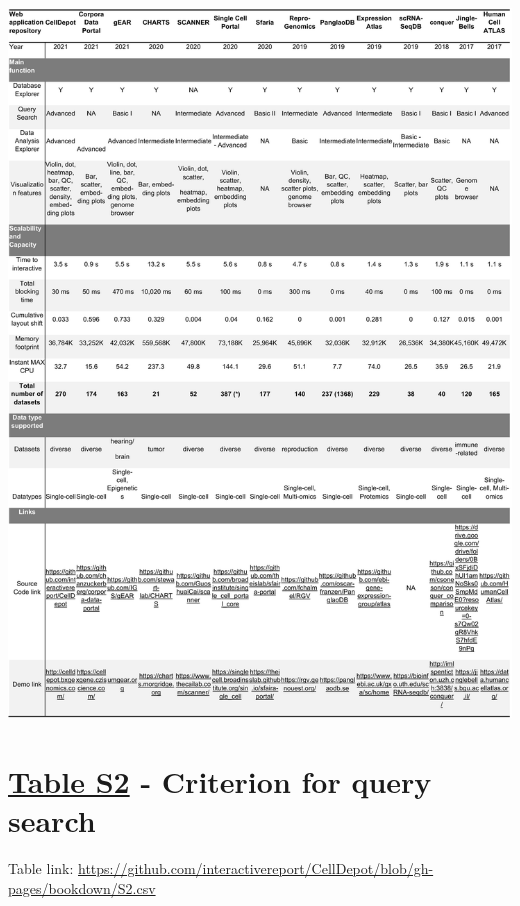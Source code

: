 \documentclass[
  openany]{book}
\begin{document}
\href{figures/table_s1.jpg}{\includegraphics{figures/table_s1.jpg}}





\hypertarget{table-s2---criterion-for-query-search}{%
\section*{\texorpdfstring{\href{https://github.com/interactivereport/CellDepot/blob/gh-pages/bookdown/S2.csv}{Table S2} - Criterion for query search}{Table S2 - Criterion for query search}}\label{table-s2---criterion-for-query-search}}

Table link: \url{https://github.com/interactivereport/CellDepot/blob/gh-pages/bookdown/S2.csv}
\end{document}
